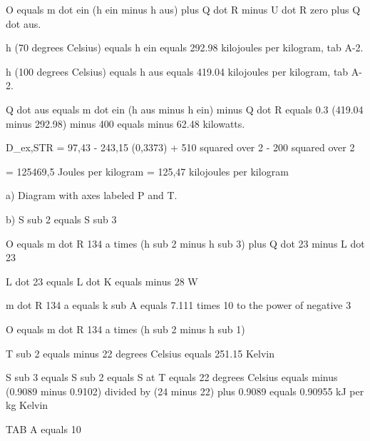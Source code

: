 O equals m dot ein (h ein minus h aus) plus Q dot R minus U dot R zero plus Q dot aus.

h (70 degrees Celsius) equals h ein equals 292.98 kilojoules per kilogram, tab A-2.

h (100 degrees Celsius) equals h aus equals 419.04 kilojoules per kilogram, tab A-2.

Q dot aus equals m dot ein (h aus minus h ein) minus Q dot R equals 0.3 (419.04 minus 292.98) minus 400 equals minus 62.48 kilowatts.

D_ex,STR = 97,43 - 243,15 (0,3373) + 510 squared over 2 - 200 squared over 2

= 125469,5 Joules per kilogram = 125,47 kilojoules per kilogram

a) Diagram with axes labeled P and T.

b) S sub 2 equals S sub 3

O equals m dot R 134 a times (h sub 2 minus h sub 3) plus Q dot 23 minus L dot 23

L dot 23 equals L dot K equals minus 28 W

m dot R 134 a equals k sub A equals 7.111 times 10 to the power of negative 3

O equals m dot R 134 a times (h sub 2 minus h sub 1)

T sub 2 equals minus 22 degrees Celsius equals 251.15 Kelvin

S sub 3 equals S sub 2 equals S at T equals 22 degrees Celsius equals minus (0.9089 minus 0.9102) divided by (24 minus 22) plus 0.9089 equals 0.90955 kJ per kg Kelvin

TAB A equals 10